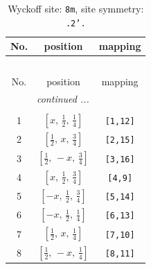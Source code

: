 \documentclass[fleqn,8pt]{jsarticle}
\begin{document}
\begin{longtable}{ccc}
\caption{Wyckoff site: {\tt 8m}, site symmetry: {\tt .2'.}}
 \\
 \hline \hline
No. & position & mapping \\ \hline \endfirsthead

\multicolumn{2}{l}{\tablename\ \thetable{}} \\
 \hline \hline
No. & position & mapping \\ \hline \endhead

 \hline \hline
\multicolumn{2}{r}{\footnotesize\it continued ...} \\ \endfoot

 \hline \hline
\multicolumn{2}{r}{} \\ \endlastfoot

1 & $\left[ x,\, \frac{1}{2},\, \frac{1}{4} \right]$ & {\tt [1,12]} \\ \hline
2 & $\left[ \frac{1}{2},\, x,\, \frac{3}{4} \right]$ & {\tt [2,15]} \\ \hline
3 & $\left[ \frac{1}{2},\, - x,\, \frac{3}{4} \right]$ & {\tt [3,16]} \\ \hline
4 & $\left[ x,\, \frac{1}{2},\, \frac{3}{4} \right]$ & {\tt [4,9]} \\ \hline
5 & $\left[ - x,\, \frac{1}{2},\, \frac{3}{4} \right]$ & {\tt [5,14]} \\ \hline
6 & $\left[ - x,\, \frac{1}{2},\, \frac{1}{4} \right]$ & {\tt [6,13]} \\ \hline
7 & $\left[ \frac{1}{2},\, x,\, \frac{1}{4} \right]$ & {\tt [7,10]} \\ \hline
8 & $\left[ \frac{1}{2},\, - x,\, \frac{1}{4} \right]$ & {\tt [8,11]} \\
\end{longtable}
\renewcommand{\arraystretch}{1.2}
\end{document}
